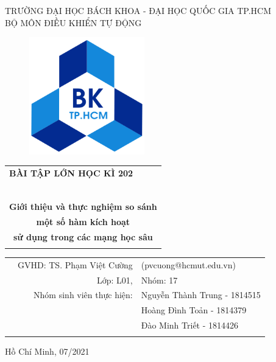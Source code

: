 \documentclass[a4paper, 12pt]{report}
\begin{document}
\begin{titlepage}

\begin{center}
TRƯỜNG ĐẠI HỌC BÁCH KHOA - ĐẠI HỌC QUỐC GIA TP.HCM\\
BỘ MÔN ĐIỀU KHIỂN TỰ ĐỘNG
\end{center}

\vspace{1cm}

\begin{figure}[!h]
\begin{center}
\includegraphics[width=5cm]{hcmut.png}
\end{center}
\end{figure}

\vspace{1cm}


\begin{center}
\begin{tabular}{c}
\multicolumn{1}{l}{\textbf{{\Large BÀI TẬP LỚN HỌC KÌ 202}}}\\
~~\\
\hline
\\
\textbf{\Huge Giới thiệu và thực nghiệm so sánh}\\
\textbf{\Huge một số hàm kích hoạt}\\
\textbf{\Huge sử dụng trong các mạng học sâu}\\
\\
\hline
\end{tabular}
\end{center}

\vspace{1cm}

\begin{table}[h]
\begin{tabular}{rrl}

\hspace{2cm} & GVHD: TS. Phạm Việt Cường & (pvcuong@hcmut.edu.vn)\\
& Lớp: L01, & Nhóm: 17\\
& Nhóm sinh viên thực hiện: & Nguyễn Thành Trung - 1814515\\
& & Hoàng Đình Toản - 1814379\\
& & Đào Minh Triết - 1814426\\
\vspace{30pt}\\

\end{tabular}
\end{table}

\begin{center}
{\footnotesize Hồ Chí Minh, 07/2021}
\end{center}
\end{titlepage}
\end{document}
